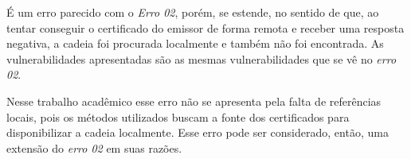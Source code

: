 	É um erro parecido com o \textit{Erro 02}, porém, se estende, no sentido de que, ao tentar conseguir o certificado do emissor de forma remota e receber uma resposta negativa, a cadeia foi procurada localmente e também não foi encontrada. As vulnerabilidades apresentadas são as mesmas vulnerabilidades que se vê no \textit{erro 02}. 

	Nesse trabalho acadêmico esse erro não se apresenta pela falta de referências locais, pois os métodos utilizados buscam a fonte dos certificados para disponibilizar a cadeia localmente. Esse erro pode ser considerado, então, uma extensão do \textit{erro 02} em suas razões.
